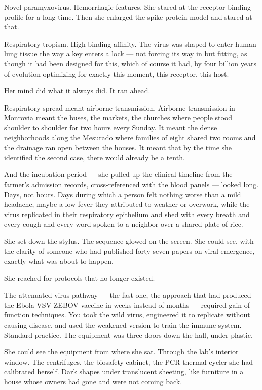 Novel paramyxovirus. Hemorrhagic features. She stared at the receptor binding profile for a long time. Then she enlarged the spike protein model and stared at that.

Respiratory tropism. High binding affinity. The virus was shaped to enter human lung tissue the way a key enters a lock --- not forcing its way in but fitting, as though it had been designed for this, which of course it had, by four billion years of evolution optimizing for exactly this moment, this receptor, this host.

Her mind did what it always did. It ran ahead.

Respiratory spread meant airborne transmission. Airborne transmission in Monrovia meant the buses, the markets, the churches where people stood shoulder to shoulder for two hours every Sunday. It meant the dense neighborhoods along the Mesurado where families of eight shared two rooms and the drainage ran open between the houses. It meant that by the time she identified the second case, there would already be a tenth.

And the incubation period --- she pulled up the clinical timeline from the farmer's admission records, cross-referenced with the blood panels --- looked long. Days, not hours. Days during which a person felt nothing worse than a mild headache, maybe a low fever they attributed to weather or overwork, while the virus replicated in their respiratory epithelium and shed with every breath and every cough and every word spoken to a neighbor over a shared plate of rice.

She set down the stylus. The sequence glowed on the screen. She could see, with the clarity of someone who had published forty-seven papers on viral emergence, exactly what was about to happen.

She reached for protocols that no longer existed.

The attenuated-virus pathway --- the fast one, the approach that had produced the Ebola VSV-ZEBOV vaccine in weeks instead of months --- required gain-of-function techniques. You took the wild virus, engineered it to replicate without causing disease, and used the weakened version to train the immune system. Standard practice. The equipment was three doors down the hall, under plastic.

She could see the equipment from where she sat. Through the lab's interior window. The centrifuges, the biosafety cabinet, the PCR thermal cycler she had calibrated herself. Dark shapes under translucent sheeting, like furniture in a house whose owners had gone and were not coming back.

